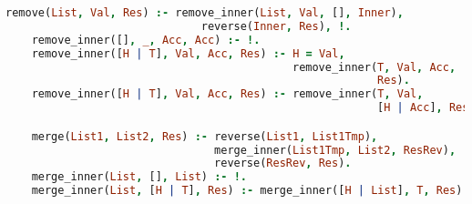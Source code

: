 \begin{lstlisting}[language=Prolog]
    remove(List, Val, Res) :- remove_inner(List, Val, [], Inner),
                              reverse(Inner, Res), !.
    remove_inner([], _, Acc, Acc) :- !.
    remove_inner([H | T], Val, Acc, Res) :- H = Val,
                                            remove_inner(T, Val, Acc,
                                                         Res).
    remove_inner([H | T], Val, Acc, Res) :- remove_inner(T, Val,
                                                         [H | Acc], Res).

    merge(List1, List2, Res) :- reverse(List1, List1Tmp),
                                merge_inner(List1Tmp, List2, ResRev),
                                reverse(ResRev, Res).
    merge_inner(List, [], List) :- !.
    merge_inner(List, [H | T], Res) :- merge_inner([H | List], T, Res).
\end{lstlisting}


